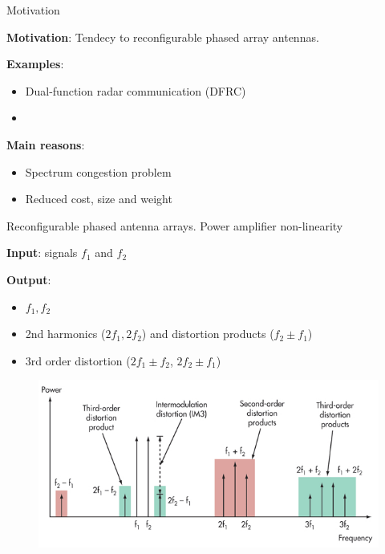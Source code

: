 \documentclass[../main.tex]{subfiles}
\begin{document}
%
%


\begin{frame}[t]{Motivation}

\textbf{Motivation}: Tendecy to reconfigurable phased array antennas.

\textbf{Examples}:

\begin{itemize}
    \item Dual-function radar communication (DFRC)
    \item 
\end{itemize}

\textbf{Main reasons}: 
\begin{itemize}
    \item Spectrum congestion problem
    \item Reduced cost, size and weight
\end{itemize}


\end{frame}


%
%



\begin{frame}[t]{Reconfigurable phased antenna arrays. Power amplifier non-linearity}

\textbf{Input}: signals $f_1$ and $f_2$

\textbf{Output}: 
\begin{itemize}
    \item $f_1, f_2$
    \item 2nd harmonics ($2f_1, 2f_2$) and distortion products ($f_2 \pm f_1$)
    \item 3rd order distortion ($2f_1 \pm f_2$, $2f_2 \pm f_1$)
\end{itemize}

\begin{figure}[H]
\begin{adjustbox}{width=0.6\columnwidth}
\includegraphics{pics/IMD.jpg}
\end{adjustbox}
\end{figure}


\end{frame}
\end{document}
